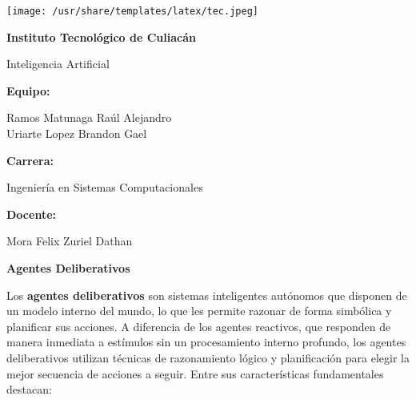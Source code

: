 \documentclass[14pt]{extarticle}
\begin{document}
  
  \thispagestyle{empty}

  \texttt{[image: /usr/share/templates/latex/tec.jpeg]}

  \begin{center}
    {\LARGE \textbf{Instituto Tecnológico de Culiacán}}

    \vspace{1cm}
    {\Large Inteligencia Artificial}

    \vspace{4cm}
    {\large \textbf{Equipo:}}

    \vspace{0.3cm}
    {\large
      Ramos Matunaga Raúl Alejandro\\\vspace{0.3cm}
      Uriarte Lopez Brandon Gael
    }

    \vspace{2cm}
    {\large \textbf{Carrera:}}

    \vspace{0.3cm}
    {\large Ingeniería en Sistemas Computacionales}

    \vspace{2cm}
    {\large \textbf{Docente:}}

    \vspace{0.3cm}
    {\large Mora Felix Zuriel Dathan}
  \end{center}

  \newpage

  {\large \textbf{Agentes Deliberativos}}

  \vspace{0.5cm}
  Los \textbf{agentes deliberativos} son sistemas inteligentes autónomos que disponen de un modelo interno del mundo, lo que les permite razonar de forma simbólica y planificar sus acciones. A diferencia de los agentes reactivos, que responden de manera inmediata a estímulos sin un procesamiento interno profundo, los agentes deliberativos utilizan técnicas de razonamiento lógico y planificación para elegir la mejor secuencia de acciones a seguir. Entre sus características fundamentales destacan:
\end{document}
